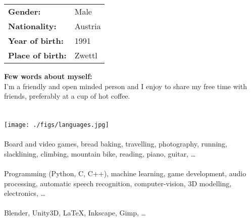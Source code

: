 {


\begin{tabular} { l p{3.9cm} }
  \textbf{Gender:} & Male\\
  \textbf{Nationality:} & Austria\\
  \textbf{Year of birth:} & 1991\\
  \textbf{Place of birth:} & Zwettl\\
\end{tabular}

\textbf{Few words about myself:}\\
I'm a friendly and open minded person and I enjoy to share my free time with friends, preferably at a cup of hot coffee.\\


\\\\
\begingroup \centering \texttt{[image: ./figs/languages.jpg]} \endgroup\\



\\
Board and video games, bread baking, travelling, photography, running, slacklining, climbing, mountain bike, reading, piano, guitar, \dots\\


\\
Programming (Python, C, C++), machine learning, game development, audio processing, automatic speech recognition, computer-vision, 3D modelling, electronics, \dots\\


\\
Blender, Unity3D, \LaTeX, Inkscape, Gimp, \dots
}